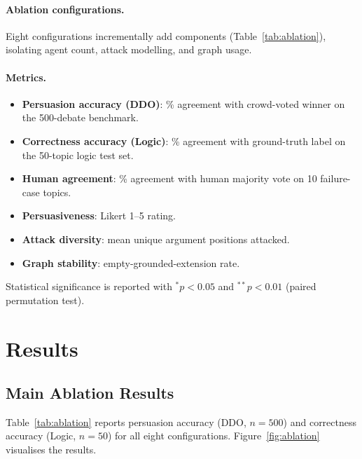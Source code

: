 \documentclass[11pt,twocolumn,letterpaper]{article}
\newcommand{\DDOSample}{500}
\begin{document}
\paragraph{Ablation configurations.}
Eight configurations incrementally add components
(Table~\ref{tab:ablation}), isolating agent count, attack modelling, and
graph usage.

\paragraph{Metrics.}
\begin{itemize}[leftmargin=*]
  \item \textbf{Persuasion accuracy (DDO)}: \% agreement with crowd-voted
    winner on the \DDOSample-debate benchmark.
  \item \textbf{Correctness accuracy (Logic)}: \% agreement with ground-truth
    label on the 50-topic logic test set.
  \item \textbf{Human agreement}: \% agreement with human majority vote on
    10 failure-case topics.
  \item \textbf{Persuasiveness}: Likert 1--5 rating.
  \item \textbf{Attack diversity}: mean unique argument positions attacked.
  \item \textbf{Graph stability}: empty-grounded-extension rate.
\end{itemize}

Statistical significance is reported with ${}^{*}p{<}0.05$ and
${}^{**}p{<}0.01$ (paired permutation test).

\section{Results}
\label{sec:results}

\subsection{Main Ablation Results}

Table~\ref{tab:ablation} reports persuasion accuracy (DDO, $n{=}500$) and
correctness accuracy (Logic, $n{=}50$) for all eight configurations.
Figure~\ref{fig:ablation} visualises the results.
\end{document}
